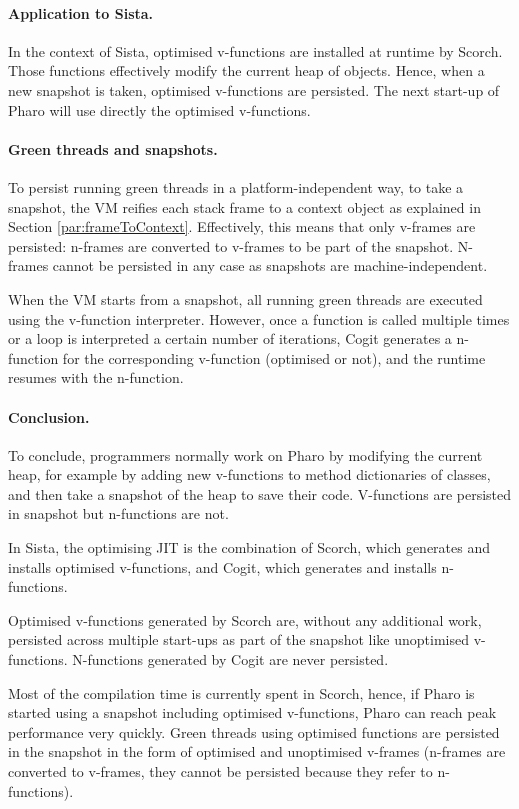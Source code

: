 \documentclass[a4paper,12pt,twoside]{../includes/ThesisStyle}
\begin{document}
\paragraph{Application to Sista.}In the context of Sista, optimised v-functions are installed at runtime by Scorch. Those functions effectively modify the current heap of objects. Hence, when a new snapshot is taken, optimised v-functions are persisted. The next start-up of Pharo will use directly the optimised v-functions.

\paragraph{Green threads and snapshots.}To persist running green threads in a platform-independent way, to take a snapshot, the VM reifies each stack frame to a context object as explained in Section \ref{par:frameToContext}. Effectively, this means that only v-frames are persisted: n-frames are converted to v-frames to be part of the snapshot. N-frames cannot be persisted in any case as snapshots are machine-independent.

When the VM starts from a snapshot, all running green threads are executed using the v-function interpreter. However, once a function is called multiple times or a loop is interpreted a certain number of iterations, Cogit generates a n-function for the corresponding v-function (optimised or not), and the runtime resumes with the n-function.

\paragraph{Conclusion.}To conclude, programmers normally work on Pharo by modifying the current heap, for example by adding new v-functions to method dictionaries of classes, and then take a snapshot of the heap to save their code. V-functions are persisted in snapshot but n-functions are not. 

In Sista, the optimising JIT is the combination of Scorch, which generates and installs optimised v-functions, and Cogit, which generates and installs n-functions. 

Optimised v-functions generated by Scorch are, without any additional work, persisted across multiple start-ups as part of the snapshot like unoptimised v-functions. N-functions generated by Cogit are never persisted. 

Most of the compilation time is currently spent in Scorch, hence, if Pharo is started using a snapshot including optimised v-functions, Pharo can reach peak performance very quickly. Green threads using optimised functions are persisted in the snapshot in the form of optimised and unoptimised v-frames (n-frames are converted to v-frames, they cannot be persisted because they refer to n-functions). 
\end{document}
